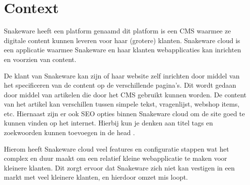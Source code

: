 \section{Context}
Snakeware heeft een platform genaamd  dit platform is een \gls{CMS} waarmee ze digitale content kunnen leveren voor haar (grotere) klanten.
Snakeware cloud is een applicatie waarmee Snakeware en haar klanten webapplicaties kan inrichten en voorzien van content.

\whitespace[2]
De klant van Snakeware kan zijn of haar website zelf inrichten door middel van het specificeren van de content op de verschillende pagina’s.
Dit wordt gedaan door middel van artikelen die door het \gls{CMS} gebruikt kunnen worden.
De content van het artikel kan verschillen tussen simpele tekst, vragenlijst, webshop items, etc.
Hiernaast zijn er ook \gls{SEO} opties binnen Snakeware cloud om de site goed te kunnen vinden op het internet.
Hierbij kun je denken aan titel tags en zoekwoorden kunnen toevoegen in de head \Parencite{HTMLhead}.

\whitespace[2]
Hierom heeft Snakeware cloud veel features en configuratie stappen wat het complex en duur maakt om een relatief kleine webapplicatie te maken voor kleinere klanten.
Dit zorgt ervoor dat Snakeware zich niet kan vestigen in een markt met veel kleinere klanten, en hierdoor omzet mis loopt.
